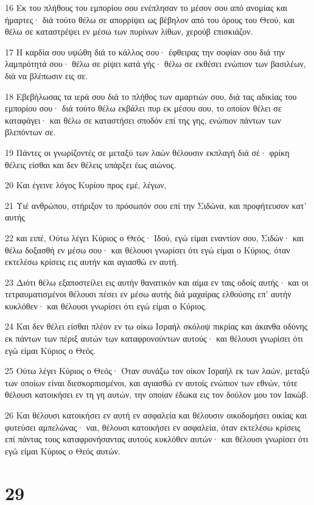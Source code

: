 \par 16 Εκ του πλήθους του εμπορίου σου ενέπλησαν το μέσον σου από ανομίας και ήμαρτες· διά τούτο θέλω σε απορρίψει ως βέβηλον από του όρους του Θεού, και θέλω σε καταστρέψει εν μέσω των πυρίνων λίθων, χερούβ επισκιάζον.
\par 17 Η καρδία σου υψώθη διά το κάλλος σου· έφθειρας την σοφίαν σου διά την λαμπρότητά σου· θέλω σε ρίψει κατά γής· θέλω σε εκθέσει ενώπιον των βασιλέων, διά να βλέπωσιν εις σε.
\par 18 Εβεβήλωσας τα ιερά σου διά το πλήθος των αμαρτιών σου, διά τας αδικίας του εμπορίου σου· διά τούτο θέλω εκβάλει πυρ εκ μέσου σου, το οποίον θέλει σε καταφάγει· και θέλω σε καταστήσει σποδόν επί της γης, ενώπιον πάντων των βλεπόντων σε.
\par 19 Πάντες οι γνωρίζοντές σε μεταξύ των λαών θέλουσιν εκπλαγή διά σέ· φρίκη θέλεις είσθαι και δεν θέλεις υπάρξει έως αιώνος.
\par 20 Και έγεινε λόγος Κυρίου προς εμέ, λέγων,
\par 21 Υιέ ανθρώπου, στήριξον το πρόσωπόν σου επί την Σιδώνα, και προφήτευσον κατ' αυτής
\par 22 και ειπέ, Ούτω λέγει Κύριος ο Θεός· Ιδού, εγώ είμαι εναντίον σου, Σιδών· και θέλω δοξασθή εν μέσω σου· και θέλουσι γνωρίσει ότι εγώ είμαι ο Κύριος, όταν εκτελέσω κρίσεις εις αυτήν και αγιασθώ εν αυτή.
\par 23 Διότι θέλω εξαποστείλει εις αυτήν θανατικόν και αίμα εν ταις οδοίς αυτής· και οι τετραυματισμένοι θέλουσι πέσει εν μέσω αυτής διά μαχαίρας ελθούσης επ' αυτήν κυκλόθεν· και θέλουσι γνωρίσει ότι εγώ είμαι ο Κύριος.
\par 24 Και δεν θέλει είσθαι πλέον εν τω οίκω Ισραήλ σκόλοψ πικρίας και άκανθα οδύνης εκ πάντων των πέριξ αυτών των καταφρονούντων αυτούς· και θέλουσι γνωρίσει ότι εγώ είμαι Κύριος ο Θεός.
\par 25 Ούτω λέγει Κύριος ο Θεός· Όταν συνάξω τον οίκον Ισραήλ εκ των λαών, μεταξύ των οποίων είναι διεσκορπισμένοι, και αγιασθώ εν αυτοίς ενώπιον των εθνών, τότε θέλουσι κατοικήσει εν τη γη αυτών, την οποίαν έδωκα εις τον δούλον μου τον Ιακώβ.
\par 26 Και θέλουσι κατοικήσει εν αυτή εν ασφαλεία και θέλουσιν οικοδομήσει οικίας και φυτεύσει αμπελώνας· ναι, θέλουσι κατοικήσει εν ασφαλεία, όταν εκτελέσω κρίσεις επί πάντας τους καταφρονήσαντας αυτούς κυκλόθεν αυτών· και θέλουσι γνωρίσει ότι εγώ είμαι Κύριος ο Θεός αυτών.

\chapter{29}

